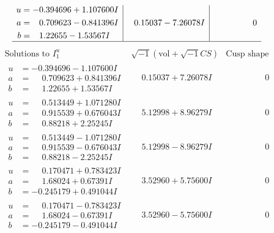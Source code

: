 \documentclass[1p]{elsarticle_modified}
\theoremstyle{definition}
\newcommand{\I}{\sqrt{-1}}
\begin{document}
$$\begin{array}{c|c|c}
\begin{aligned}
u &= -0.394696 + 1.107600 I \\
a &= \phantom{-}0.709623 - 0.841396 I \\
b &= \phantom{-}1.22655 - 1.53567 I\end{aligned}
 & \phantom{-}0.15037 - 7.26078 I & \phantom{-0.000000 } 0\\
 \hline 
 \end{array}$$\newpage$$\begin{array}{c|c|c}  
\text{Solutions to }I^u_{1}& \I (\text{vol} + \sqrt{-1}CS) & \text{Cusp shape}\\
 \hline 
\begin{aligned}
u &= -0.394696 - 1.107600 I \\
a &= \phantom{-}0.709623 + 0.841396 I \\
b &= \phantom{-}1.22655 + 1.53567 I\end{aligned}
 & \phantom{-}0.15037 + 7.26078 I & \phantom{-0.000000 } 0 \\ \hline\begin{aligned}
u &= \phantom{-}0.513449 + 1.071280 I \\
a &= \phantom{-}0.915539 + 0.676043 I \\
b &= \phantom{-}0.88218 + 2.25245 I\end{aligned}
 & \phantom{-}5.12998 + 8.96279 I & \phantom{-0.000000 } 0 \\ \hline\begin{aligned}
u &= \phantom{-}0.513449 - 1.071280 I \\
a &= \phantom{-}0.915539 - 0.676043 I \\
b &= \phantom{-}0.88218 - 2.25245 I\end{aligned}
 & \phantom{-}5.12998 - 8.96279 I & \phantom{-0.000000 } 0 \\ \hline\begin{aligned}
u &= \phantom{-}0.170471 + 0.783423 I \\
a &= \phantom{-}1.68024 + 0.67391 I \\
b &= -0.245179 + 0.491044 I\end{aligned}
 & \phantom{-}3.52960 + 5.75600 I & \phantom{-0.000000 } 0 \\ \hline\begin{aligned}
u &= \phantom{-}0.170471 - 0.783423 I \\
a &= \phantom{-}1.68024 - 0.67391 I \\
b &= -0.245179 - 0.491044 I\end{aligned}
 & \phantom{-}3.52960 - 5.75600 I & \phantom{-0.000000 } 0 \\ \hline\begin{aligned}

\end{aligned}
\end{array}$$
\end{document}
